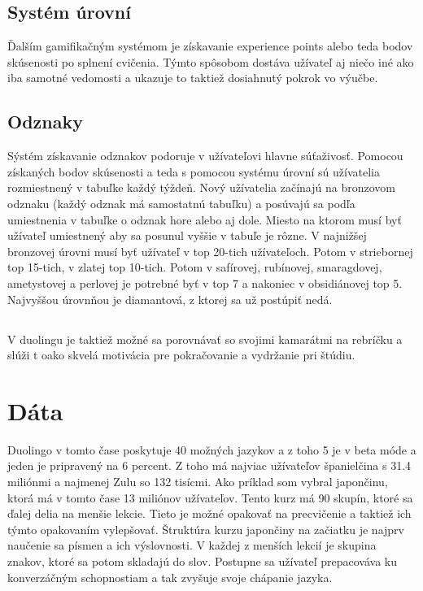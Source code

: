 \documentclass[10pt,oneside,slovak,a4paper]{article}
\begin{document}
\subsection{Systém úrovní}
Ďalším gamifikačným systémom je získavanie experience points alebo teda bodov skúsenosti po splnení cvičenia. Týmto spôsobom dostáva užívateľ aj niečo iné ako iba samotné vedomosti a ukazuje to taktiež dosiahnutý pokrok vo výučbe.

\subsection{Odznaky}
Sýstém získavanie odznakov podoruje v užívateľovi hlavne súťaživosť. Pomocou získaných bodov skúsenosti a teda s pomocou systému úrovní sú užívatelia rozmiestnený v tabuľke každý týždeň. Nový užívatelia začínajú na bronzovom odznaku (každý odznak má samostatnú tabuľku) a posúvajú sa podľa umiestnenia v tabuľke o odznak hore alebo aj dole. Miesto na ktorom musí byť užívateľ umiestnený  aby sa posunul vyššie v tabuľe je rôzne. V najnižšej bronzovej úrovni musí byť užívateľ v top 20-tich užívateľoch. Potom v striebornej top 15-tich, v zlatej top 10-tich. Potom v safírovej, rubínovej, smaragdovej, ametystovej a perlovej je potrebné byť v top 7 a nakoniec v obsidiánovej top 5. Najvyššou úrovnňou je diamantová, z ktorej  sa už postúpiť nedá.

\subsection{}
\cite{Huynh2016}V duolingu je taktiež možné sa porovnávať so svojimi kamarátmi na rebríčku a slúži t oako skvelá motivácia pre pokračovanie a vydržanie pri štúdiu.


\section{Dáta}
Duolingo v tomto čase poskytuje 40 možných jazykov a z toho 5 je v beta móde a jeden je pripravený na 6 percent. Z toho má najviac užívateľov španielčina s 31.4 miliónmi a najmenej Zulu so 132 tisícmi. Ako príklad som vybral japončinu, ktorá má v tomto čase 13 miliónov užívateľov. Tento kurz má 90 skupín, ktoré sa ďalej delia na menšie lekcie. Tieto je možné opakovať na precvičenie a taktiež ich týmto opakovaním vylepšovať. Štruktúra kurzu japončiny na začiatku je najprv naučenie sa písmen a ich výslovnosti. V každej z menších lekcií je skupina znakov, ktoré sa potom skladajú do slov. Postupne sa užívateľ prepacováva ku konverzáčným schopnostiam a tak zvyšuje svoje chápanie jazyka.
\end{document}
